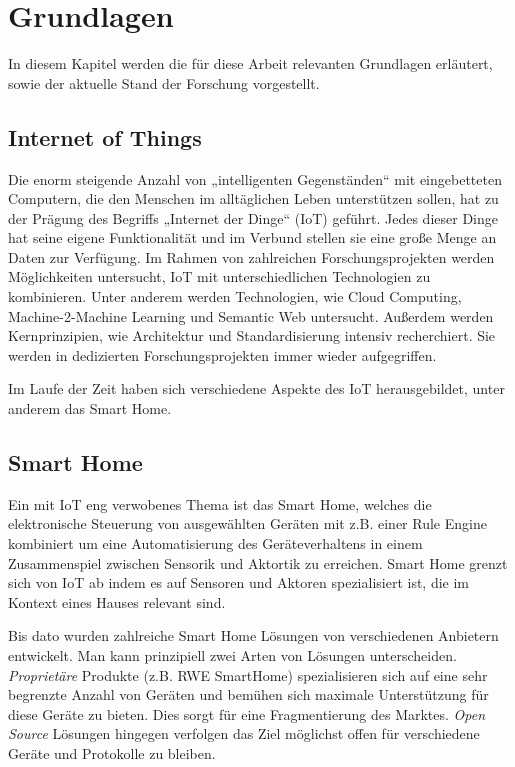 \documentclass[12pt]{article}
\begin{document}
\maketitle


\section{Grundlagen}
In diesem Kapitel werden die für diese Arbeit relevanten Grundlagen erläutert, sowie der aktuelle Stand der Forschung vorgestellt.

\subsection{Internet of Things}
Die enorm steigende Anzahl von „intelligenten Gegenständen“ mit eingebetteten Computern, die den Menschen im alltäglichen Leben unterstützen sollen, hat zu der Prägung des Begriffs „Internet der Dinge“ (IoT) geführt. Jedes dieser Dinge hat seine eigene Funktionalität und im Verbund stellen sie eine große Menge an Daten zur Verfügung. Im Rahmen von zahlreichen Forschungsprojekten \cite{ierc:portfolios} werden Möglichkeiten untersucht, IoT mit unterschiedlichen Technologien zu kombinieren. Unter anderem werden Technologien, wie Cloud Computing, Machine-2-Machine Learning und Semantic Web untersucht. Außerdem werden Kernprinzipien, wie Architektur und Standardisierung intensiv recherchiert. Sie werden in dedizierten Forschungsprojekten \cite{icore:achitecture}\cite{iota:d25} immer wieder aufgegriffen.

Im Laufe der Zeit haben sich verschiedene Aspekte des IoT herausgebildet, unter anderem das Smart Home.

\subsection{Smart Home}
Ein mit IoT eng verwobenes Thema ist das Smart Home, welches die elektronische Steuerung von ausgewählten Geräten mit z.B. einer Rule Engine kombiniert um eine Automatisierung des Geräteverhaltens in einem Zusammenspiel zwischen Sensorik und Aktortik zu erreichen. Smart Home grenzt sich von IoT ab indem es auf Sensoren und Aktoren spezialisiert ist, die im Kontext eines Hauses relevant sind.

Bis dato wurden zahlreiche Smart Home Lösungen von verschiedenen Anbietern entwickelt. Man kann prinzipiell zwei Arten von Lösungen unterscheiden. \textit{Proprietäre} Produkte (z.B. RWE SmartHome) spezialisieren sich auf eine sehr begrenzte Anzahl von Geräten und bemühen sich maximale Unterstützung für diese Geräte zu bieten. Dies sorgt für eine Fragmentierung des Marktes. \textit{Open Source} Lösungen hingegen verfolgen das Ziel möglichst offen für verschiedene Geräte und Protokolle zu bleiben. 
\end{document}
